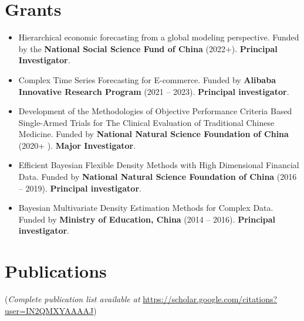 \documentclass[twoside,a4paper]{article}
\begin{document}
\section{Grants}
\begin{itemize}
\item Hierarchical economic forecasting from a global modeling perspective. Funded by the \textbf{National Social Science Fund of China} (2022+). \textbf{Principal Investigator}.

\item Complex Time Series Forecasting for E-commerce. Funded by \textbf{Alibaba Innovative Research Program} (2021 -- 2023). \textbf{Principal investigator}.

\item Development of the Methodologies of Objective Performance Criteria Based Single-Armed Trials for The Clinical Evaluation of Traditional Chinese Medicine. Funded by \textbf{National Natural Science Foundation of China} (2020+  ). \textbf{Major Investigator}.

\item Efficient Bayesian Flexible Density Methods with High Dimensional Financial Data. Funded by \textbf{National Natural Science Foundation of China} (2016 -- 2019). \textbf{Principal investigator}.

\item Bayesian Multivariate Density Estimation Methods for Complex Data. Funded by \textbf{Ministry of Education, China} (2014 -- 2016). \textbf{Principal investigator}.

\end{itemize}

\section{Publications}

(\emph{Complete publication list available at}
  \url{https://scholar.google.com/citations?user=IN2QMXYAAAAJ})
\end{document}
